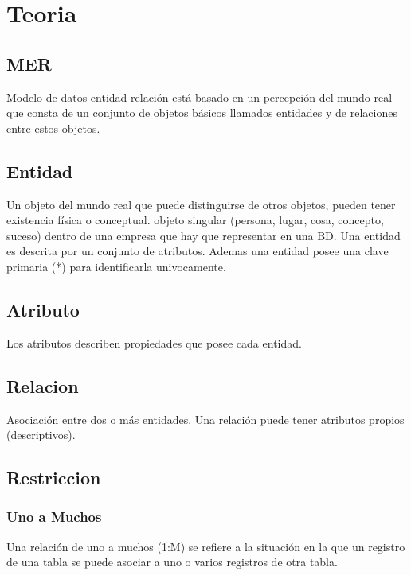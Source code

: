 \documentclass{templateNote}
\begin{document}
\portada 
\margenes %

\section{Teoria}
\subsection{MER}
\indent
Modelo de datos entidad-relación está basado en un percepción del mundo real que consta de un conjunto de objetos
básicos llamados entidades y de relaciones entre estos objetos.

\subsection{Entidad}
\indent
Un objeto del mundo real que puede distinguirse de otros objetos, pueden tener existencia física o conceptual.
objeto singular (persona, lugar, cosa, concepto, suceso) dentro de una empresa que hay que representar
en una BD. Una entidad es descrita por un conjunto de atributos. Ademas una entidad posee una clave primaria (*) para 
identificarla univocamente.


\subsection{Atributo}
\indent
Los atributos describen propiedades que posee cada entidad.

\subsection{Relacion}
\indent
Asociación entre dos o más entidades. Una relación puede tener atributos propios (descriptivos).


\subsection{Restriccion}
\subsubsection{Uno a Muchos}
\indent
Una relación de uno a muchos (1:M) se refiere a la situación en la que un registro
de una tabla se puede asociar a uno o varios registros de otra tabla.
\end{document}
